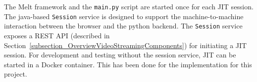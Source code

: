 \documentclass[../MasterThesis.tex]{subfiles}
\begin{document}
The Melt framework and the \texttt{main.py} script are started once for each JIT session.
The java-based \texttt{Session} service is designed to support the machine-to-machine interaction between the browser and the python backend. 
The \texttt{Session} service exposes a REST API (described in Section~\ref{subsection_OverviewVideoStreamingComponents}) for initiating a JIT session. 
%
%
%
%
%
%
%
%
%
For development and testing without the session service, JIT can be started in a Docker container. This has been done for the implementation for this project.


\end{document}
